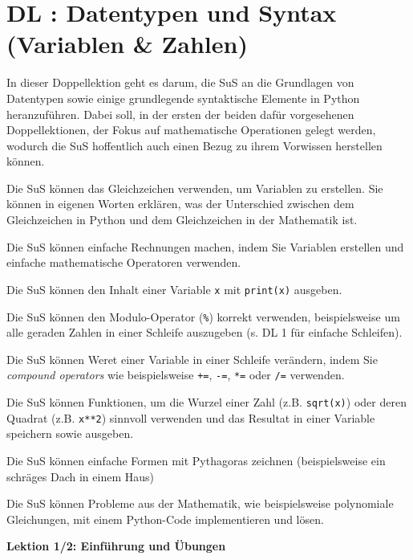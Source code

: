 \section{DL \themycounter: Datentypen und Syntax (Variablen \& Zahlen)}
\begin{myExBox}[title=DL \themycounter]
In dieser Doppellektion geht es darum, die SuS an die Grundlagen von Datentypen sowie einige grundlegende syntaktische Elemente in Python heranzuführen. Dabei soll, in der ersten der beiden dafür vorgesehenen Doppellektionen, der Fokus auf mathematische Operationen gelegt werden, wodurch die SuS hoffentlich auch einen Bezug zu ihrem Vorwissen herstellen können.

\begin{todolist}
    \item Die SuS können das Gleichzeichen verwenden, um Variablen zu erstellen. Sie können in eigenen Worten erklären, was der Unterschied zwischen dem Gleichzeichen in Python und dem Gleichzeichen in der Mathematik ist.
    \item Die SuS können einfache Rechnungen machen, indem Sie Variablen erstellen und einfache mathematische Operatoren verwenden.
    \item Die SuS können den Inhalt einer Variable \lstinline|x| mit \lstinline|print(x)| ausgeben.
    \item Die SuS können den Modulo-Operator (\texttt{\%}) korrekt verwenden, beispielsweise um alle geraden Zahlen in einer Schleife auszugeben  (s. DL 1 für einfache Schleifen).
    \item Die SuS können Weret einer Variable in einer Schleife verändern, indem Sie \textit{compound operators} wie beispielsweise \lstinline|+=|, \lstinline|-=|, \lstinline|*=| oder \lstinline|/=| verwenden.
    \item Die SuS können Funktionen, um die Wurzel einer Zahl (z.B. \lstinline|sqrt(x)|) oder deren Quadrat (z.B. \lstinline|x**2|) sinnvoll verwenden und das Resultat in einer Variable speichern sowie ausgeben.
    \item Die SuS können einfache Formen mit Pythagoras zeichnen (beispielsweise ein schräges Dach in einem Haus)
    \item Die SuS können Probleme aus der Mathematik, wie beispielsweise polynomiale Gleichungen, mit einem Python-Code implementieren und lösen.
\end{todolist}

\textbf{Lektion 1/2: Einführung und Übungen}


\end{myExBox}
